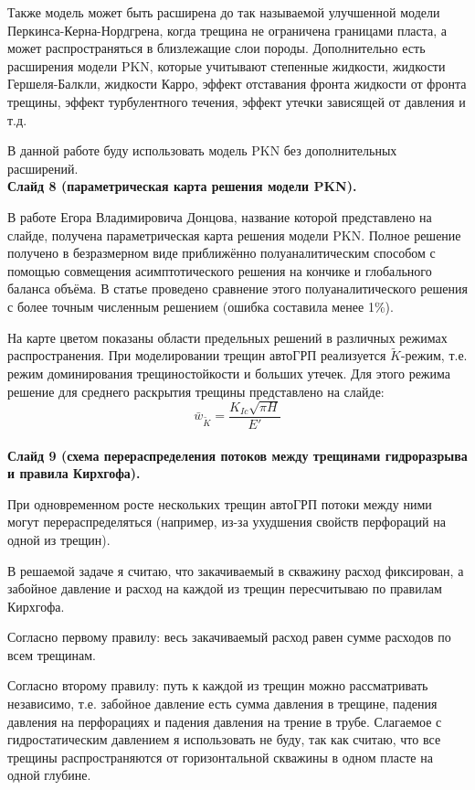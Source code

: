 \documentclass[a4paper, 12pt]{article}
\begin{document}
Также модель может быть расширена до так называемой улучшенной модели Перкинса-Керна-Нордгрена, когда трещина не ограничена границами пласта, а может распространяться в близлежащие слои породы.
Дополнительно есть расширения модели PKN, которые учитывают степенные жидкости, жидкости Гершеля-Балкли, жидкости Карро, эффект отставания фронта жидкости от фронта трещины, эффект турбулентного течения, эффект утечки зависящей от давления и т.д.

В данной работе буду использовать модель PKN без дополнительных расширений.
\\


\textbf{Слайд 8 (параметрическая карта решения модели PKN).}

В работе Егора Владимировича Донцова, название которой представлено на слайде, получена параметрическая карта решения модели PKN.
Полное решение получено в безразмерном виде приближённо полуаналитическим способом с помощью совмещения асимптотического решения на кончике и глобального баланса объёма.
В статье проведено сравнение этого полуаналитического решения с более точным численным решением (ошибка составила менее 1\%).

На карте цветом показаны области предельных решений в различных режимах распространения.
При моделировании трещин автоГРП реализуется $\tilde{K}$-режим, т.е. режим доминирования трещиностойкости и больших утечек.
Для этого режима решение для среднего раскрытия трещины представлено на слайде:
$$
\bar{w}_{\tilde{K}}=\frac{K_{Ic}\sqrt{\pi H}}{E'}
$$\\


\textbf{Слайд 9 (схема перераспределения потоков между трещинами гидроразрыва и правила Кирхгофа).}

При одновременном росте нескольких трещин автоГРП потоки между ними могут перераспределяться (например, из-за ухудшения свойств перфораций на одной из трещин).

В решаемой задаче я считаю, что закачиваемый в скважину расход фиксирован, а забойное давление и расход на каждой из трещин пересчитываю по правилам Кирхгофа.

Согласно первому правилу: весь закачиваемый расход равен сумме расходов по всем трещинам.

Согласно второму правилу: путь к каждой из трещин можно рассматривать независимо, т.е. забойное давление есть сумма давления в трещине, падения давления на перфорациях и падения давления на трение в трубе.
Слагаемое с гидростатическим давлением я использовать не буду, так как считаю, что все трещины распространяются от горизонтальной скважины в одном пласте на одной глубине.\\
\end{document}
